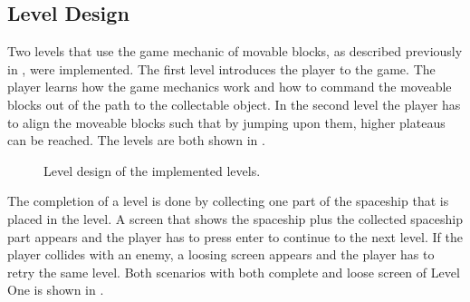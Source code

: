 \subsection{Level Design}\label{sec:game_design_level}
Two levels that use the game mechanic of movable blocks, as described previously in , were implemented.
The first level introduces the player to the game.
The player learns how the game mechanics work and how to command the moveable blocks out of the path to the collectable object.
In the second level the player has to align the moveable blocks such that by jumping upon them, higher plateaus can be reached.
The levels are both shown in .
\begin{figure}[!ht]
  \centering
  \qquad
  \caption{Level design of the implemented levels.}
  \label{fig:game_design_level}
\end{figure}
\FloatBarrier
\noindent
The completion of a level is done by collecting one part of the spaceship that is placed in the level.
A screen that shows the spaceship plus the collected spaceship part appears and the player has to press enter to continue to the next level.
If the player collides with an enemy, a loosing screen appears and the player has to retry the same level.
Both scenarios with both complete and loose screen of Level One is shown in .
